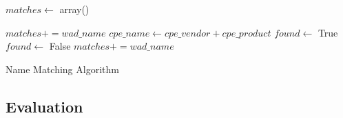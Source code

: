 \begin{algorithm}
\begin{algorithmic}
\STATE $matches\gets$ array()


		\STATE $matches+=wad\_name$
		\ELSE
		\STATE $cpe\_name\gets cpe\_vendor + cpe\_product$ 
		\STATE $found\gets$ True
		\STATE $found\gets$ False
		\ENDIF
		\ENDFOR
		\STATE $matches+=wad\_name$
		\ENDIF
		\ENDIF
\ENDFOR
\end{algorithmic}
\caption{Name Matching Algorithm}
\label{matching_algo_2}
\end{algorithm}



 
\subsection{Evaluation}

